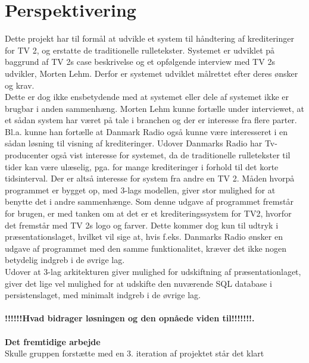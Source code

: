 \section{Perspektivering}

Dette projekt har til formål at udvikle et system til håndtering af krediteringer for TV 2, og erstatte de traditionelle rulletekster. Systemet er udviklet på baggrund af TV 2s case beskrivelse og et opfølgende interview med TV 2s udvikler, Morten Lehm. Derfor er systemet udviklet målrettet efter deres ønsker og krav. \\
Dette er dog ikke ensbetydende med at systemet eller dele af systemet ikke er brugbar i anden sammenhæng. Morten Lehm kunne fortælle under interviewet, at et sådan system har været på tale i branchen og der er interesse fra flere parter. Bl.a. kunne han fortælle at Danmark Radio også kunne være interesseret i en sådan løsning til visning af krediteringer. Udover Danmarks Radio har Tv-producenter også vist interesse for systemet, da de traditionelle rulletekster til tider kan være ulæselig, pga. for mange krediteringer i forhold til det korte tidsinterval. Der er altså interesse for system fra andre en TV 2. Måden hvorpå programmet er bygget op, med 3-lags modellen, giver stor mulighed for at benytte det i andre sammenhænge. Som denne udgave af programmet fremstår for brugen, er med tanken om at det er et krediteringssystem for TV2, hvorfor det fremstår med TV 2s logo og farver. Dette kommer dog kun til udtryk i præsentationslaget, hvilket vil sige at, hvis f.eks. Danmarks Radio ønsker en udgave af programmet med den samme funktionalitet, kræver det ikke nogen betydelig indgreb i de øvrige lag. \\
Udover at 3-lag arkitekturen giver mulighed for udskiftning af præsentationlaget, giver det lige vel mulighed for at udskifte den nuværende SQL database i persistenslaget, med minimalt indgreb i de øvrige lag. \\\\

\textbf{!!!!!!Hvad  bidrager  løsningen  og  den opnåede  viden  til!!!!!!!. }
\\\\

\textbf{Det fremtidige arbejde} \\
Skulle gruppen forstætte med en 3. iteration af projektet står det klart 